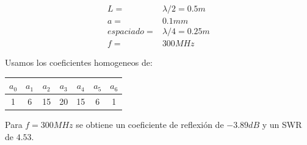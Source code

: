 \documentclass[11pt]{book}
\begin{document}
\begin{align*}
	L = &\lambda/2 =  0.5m \\
	a = & 0.1mm \\
	espaciado = & \lambda / 4 = 0.25m \\
	f = & 300MHz
\end{align*}

Usamos los coeficientes homogeneos de:

\begin{tabular}{c|c|c|c|c|c|c}
	$a_0$ & $a_1$ & $a_2$ & $a_3$ & $a_4$ & $a_5$ & $a_6$ \\ \hline
	1 & 6 & 15 & 20 & 15 & 6 & 1 \\
\end{tabular}

Para $f=300MHz$ se obtiene un coeficiente de reflexión de $-3.89dB$ y un SWR de $4.53$. 
\end{document}
